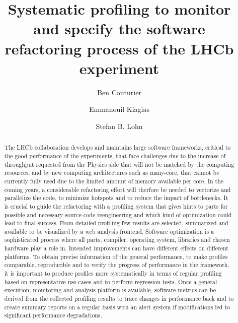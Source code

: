 \documentclass[a4paper]{jpconf}
\begin{document}
\title{Systematic profiling to monitor and specify the software refactoring process of the LHCb experiment}

\author{Ben Couturier}
\address{CERN, CH-1211 Geneva 23, Switzerland}

\author{Emmanouil Kiagias}
\address{CERN, CH-1211 Geneva 23, Switzerland}

\author{Stefan B. Lohn}
\address{CERN, CH-1211 Geneva 23, Switzerland}

\begin{abstract}
The LHCb collaboration develops and maintains large software frameworks, critical to the good performance of the experiments, that face challenges due to the increase of throughput requested from the Physics side that will not be matched by the computing resources, and by new computing architectures such as many-core, that cannot be currently fully used due to the limited amount of memory available per core. In the coming years, a considerable refactoring effort will therfore be needed to vectorize and parallelize the code, to minimize hotspots and to reduce the impact of bottlenecks. It is crucial to guide the refactoring with a profiling system that gives hints to parts for possible and necessary source-code reengineering and which kind of optimization could lead to final success. From detailed profiling few results are selected, summarized and available to be visualized by a web analysis frontend.
\newline
Software optimization is a sophisticated process where all parts, compiler, operating system, libraries and chosen hardware play a role in. Intended improvements can have different effects on different platforms. To obtain precise information of the general performance, to make profiles comparable, reproducible and to verify the progress of performance in the framework, it is important to produce profiles more systematically in terms of regular profiling based on representative use cases and to perform regression tests. Once a general execution, monitoring and analysis platform is available, software metrics can be derived from the collected profiling results to trace changes in performance back and to create summary reports on a regular basis with an alert system if modifications led to significant performance degradations.
\end{abstract}
\end{document}
